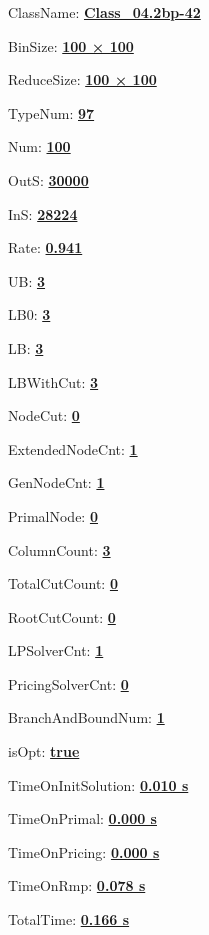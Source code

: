 \documentclass[11pt]{article}
\begin{document}
\pagestyle{empty}


ClassName: \underline{\textbf{Class_04.2bp-42}}
\par
BinSize: \underline{\textbf{100 × 100}}
\par
ReduceSize: \underline{\textbf{100 × 100}}
\par
TypeNum: \underline{\textbf{97}}
\par
Num: \underline{\textbf{100}}
\par
OutS: \underline{\textbf{30000}}
\par
InS: \underline{\textbf{28224}}
\par
Rate: \underline{\textbf{0.941}}
\par
UB: \underline{\textbf{3}}
\par
LB0: \underline{\textbf{3}}
\par
LB: \underline{\textbf{3}}
\par
LBWithCut: \underline{\textbf{3}}
\par
NodeCut: \underline{\textbf{0}}
\par
ExtendedNodeCnt: \underline{\textbf{1}}
\par
GenNodeCnt: \underline{\textbf{1}}
\par
PrimalNode: \underline{\textbf{0}}
\par
ColumnCount: \underline{\textbf{3}}
\par
TotalCutCount: \underline{\textbf{0}}
\par
RootCutCount: \underline{\textbf{0}}
\par
LPSolverCnt: \underline{\textbf{1}}
\par
PricingSolverCnt: \underline{\textbf{0}}
\par
BranchAndBoundNum: \underline{\textbf{1}}
\par
isOpt: \underline{\textbf{true}}
\par
TimeOnInitSolution: \underline{\textbf{0.010 s}}
\par
TimeOnPrimal: \underline{\textbf{0.000 s}}
\par
TimeOnPricing: \underline{\textbf{0.000 s}}
\par
TimeOnRmp: \underline{\textbf{0.078 s}}
\par
TotalTime: \underline{\textbf{0.166 s}}
\par
\newpage
\end{document}
